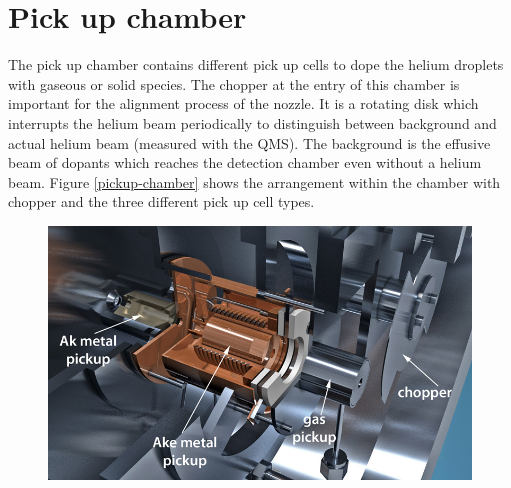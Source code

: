 \documentclass[parskip,12pt,headsepline,a4paper] {scrbook}
\begin{document}
\section{Pick up chamber}
\vspace{-1\baselineskip}
The pick up chamber contains different pick up cells to dope the helium droplets with gaseous or solid species. The chopper at the entry of this chamber is important for the alignment process of the nozzle. It is a rotating disk which interrupts the helium beam periodically to distinguish between background and actual helium beam (measured with the QMS). The background is the effusive beam of dopants which reaches the detection chamber even without a helium beam. %
Figure \ref{pickup-chamber} shows the arrangement within the chamber with chopper and the three different pick up cell types.

\begin{figure}[ht]
\centerline{
\includegraphics[width=13cm]{./experimental_setup/pickup-chamber.jpg}}
\end{figure}
\end{document}
